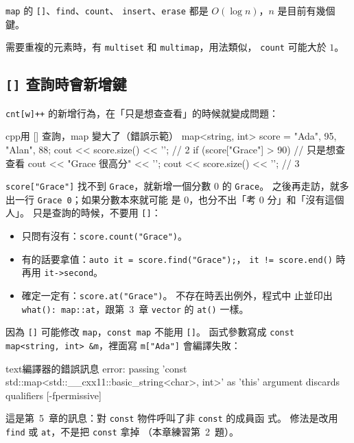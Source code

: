 \texttt{map} 的 \texttt{[]}、\texttt{find}、\texttt{count}、
\texttt{insert}、\texttt{erase} 都是 $O(\log n)$，$n$ 是目前有幾個鍵。

需要重複的元素時，有 \texttt{multiset} 和 \texttt{multimap}，用法類似，
\texttt{count} 可能大於 $1$。

\subsection{\texttt{[]} 查詢時會新增鍵}

\texttt{cnt[w]++} 的新增行為，在「只是想查查看」的時候就變成問題：

\begin{code}{cpp}{用 [] 查詢，map 變大了（錯誤示範）}
map<string, int> score = {{"Ada", 95}, {"Alan", 88}};
cout << score.size() << '\n';            // 2
if (score["Grace"] > 90) {               // 只是想查查看
    cout << "Grace 很高分" << '\n';
}
cout << score.size() << '\n';            // 3
\end{code}

\texttt{score["Grace"]} 找不到 \texttt{Grace}，就新增一個分數 $0$ 的
\texttt{Grace}。 之後再走訪，就多出一行 \texttt{Grace 0}；如果分數本來就可能
是 $0$，也分不出「考 $0$ 分」和「沒有這個人」。 只是查詢的時候，不要用
\texttt{[]}：

\begin{itemize}
\item 只問有沒有：\texttt{score.count("Grace")}。
\item 有的話要拿值：\texttt{auto it = score.find("Grace");}，
\texttt{it != score.end()} 時再用 \texttt{it->second}。
\item 確定一定有：\texttt{score.at("Grace")}。 不存在時丟出例外，程式中
止並印出 \texttt{what():  map::at}，跟第~3~章 \texttt{vector} 的
\texttt{at()} 一樣。
\end{itemize}

因為 \texttt{[]} 可能修改 \texttt{map}，\texttt{const map} 不能用
\texttt{[]}。 函式參數寫成 \texttt{const map<string, int> \&m}，裡面寫
\texttt{m["Ada"]} 會編譯失敗：

\begin{code}{text}{編譯器的錯誤訊息}
error: passing 'const std::map<std::__cxx11::basic_string<char>, int>' as 'this' argument discards qualifiers [-fpermissive]
\end{code}

這是第~5~章的訊息：對 \texttt{const} 物件呼叫了非 \texttt{const} 的成員函
式。 修法是改用 \texttt{find} 或 \texttt{at}，不是把 \texttt{const} 拿掉
（本章練習第~2~題）。

